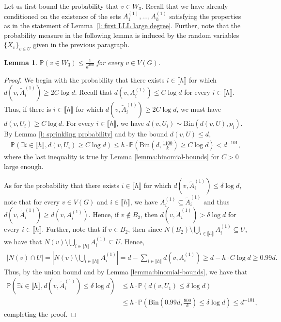 \documentclass[notitlepage]{scrartcl}
\newcommand{\br}[1]{\llbracket{#1}\rrbracket}
\newtheorem{lemma}[thm]{Lemma}
\renewcommand{\Pr}{\mathbb{P}}
\begin{document}
Let us first bound the probability that $v\in W_3$. Recall that we have already conditioned on the existence of the sets $A_1^{(1)}, \ldots, A_h^{(1)}$ satisfying the properties as in the statement of Lemma~\ref{l: first LLL large degree}. Further, note that the probability measure in the following lemma is induced by the random variables $\{X_v\}_{v \in U}$ given in the previous paragraph.
\begin{lemma}\label{l: W_2 probability}
$\mathbb{P}\left(v\in W_3\right)\le \frac{1}{d^{100}}$ for every $v\in V(G)$.
\end{lemma}
\begin{proof}
We begin with the probability that there exists $i\in \br{h}$ for which $d(v,\tilde{A}_i^{(1)})\ge 2C\log d$. Recall that $d(v, A_i^{(1)})\le C\log d$ for every $i\in \br{h}$. Thus, if there is $i\in \br{h}$ for which $d(v,\tilde{A}_i^{(1)})\ge 2C\log d$, we must have $d(v, U_i)\ge C\log d$. For every $i \in \br{h}$, we have $d(v, U_i) \sim \text{Bin}\left(d(v, U), p_i\right)$. By Lemma \ref{l: sprinkling probability} and by the bound $d(v, U) \le d$,
\begin{align*}
    \mathbb{P}\left(\exists i\in \br{h}, d(v, U_i)\ge C\log d\right)\le h\cdot \mathbb{P}\left(\text{Bin}\left(d,\frac{1100}{k}\right)\ge C\log d\right)<d^{-101},
\end{align*}
where the last inequality is true by Lemma \ref{lemma:binomial-bounds} for $C>0$ large enough. 


As for the probability that there exists $i\in \br{h}$ for which $d(v,\tilde{A}_i^{(1)})\le \delta \log d$, note that for every $v \in V(G)$ and $i \in \br{h}$, we have $A_i^{(1)}\subseteq \tilde{A}_i^{(1)}$ and thus $d(v, \tilde{A}_i^{(1)}) \ge d(v, A_i^{(1)})$. Hence, if $v \notin B_2$, then $d(v, \tilde{A}_i^{(1)}) > \delta \log d$ for every $i \in \br{h}$. Further, note that if $v \in B_2$, then since $N(B_2)\setminus \bigcup_{i\in \br{h}} A_i^{(1)}\subseteq U$, we have that $N(v)\setminus \bigcup_{i\in \br{h}} A_i^{(1)}\subseteq U$. Hence,
\begin{align}
    \left|N(v) \cap U\right| = \left|N(v) \setminus \bigcup_{i \in \br{h}} A_i^{(1)}\right| = d - \sum_{i \in \br{h}} d(v, A_i^{(1)}) \ge d - h \cdot C \log d \ge 0.99d. \label{eq: degree y}
\end{align}
Thus, by the union bound and by Lemma \ref{lemma:binomial-bounds}, we have that
\begin{align*}
    \mathbb{P}\left(\exists i \in \br{h}, d(v,\tilde{A}_i^{(1)})\le \delta\log d\right)&\le h\cdot \mathbb{P}(d(v,U_1)\le \delta \log d)\\&\le h\cdot \Pr\left(\text{Bin}\left(0.99d, \frac{900}{k}\right) \le \delta \log d\right) \le d^{-101},
\end{align*}
completing the proof.
\end{proof}
\end{document}
